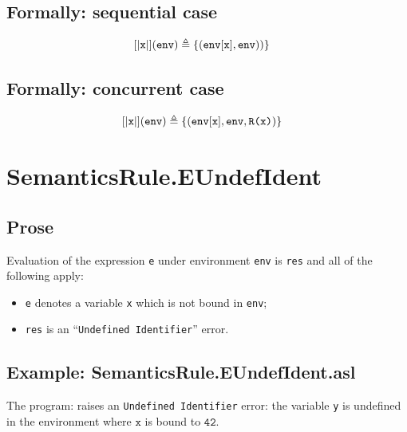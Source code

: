 \documentclass{book}
\begin{document}
\begin{formal}
  \subsection{Formally: sequential case}
  \begin{align}
  \left[| \texttt{x} \right|](\texttt{env}) & \triangleq \left\{ (\texttt{env}[\texttt{x}], \texttt{env})) \right\}
  \label{eq:sem-seq-var}
  \end{align} 
 
  \subsection{Formally: concurrent case}
  \begin{align}
  \left[| \texttt{x} \right|](\texttt{env}) & \triangleq \left\{ (\texttt{env}[\texttt{x}], \texttt{env}, \texttt{R(x)}) \right\}
  \label{eq:sem-conc-var}
  \end{align} 
\end{formal}


\section{SemanticsRule.EUndefIdent \label{sec:SemanticsRule.EUndefIdent}}

  \subsection{Prose}
  Evaluation of the expression \texttt{e} under environment \texttt{env} is
  \texttt{res} and all of the following apply:
  \begin{itemize}
  \item \texttt{e} denotes a variable \texttt{x} which is not bound in \texttt{env};
  \item \texttt{res} is an ``\texttt{Undefined Identifier}'' error.
  \end{itemize}

  \subsection{Example: SemanticsRule.EUndefIdent.asl}
    The program:
    raises an \texttt{Undefined Identifier} error: the variable \texttt{y} is
    undefined in the environment where $\mathtt{x}$ is bound to $\mathtt{42}$.
\end{document}
